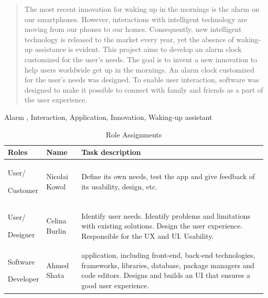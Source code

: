 \documentclass[conference]{IEEEtran}
\begin{document}
\begin{abstract}
The most recent innovation for waking up in the mornings is the alarm on our smartphones. However, interactions with intelligent technology are moving from our phones to our homes. Consequently, new intelligent technology is released to the market every year, yet the absence of waking-up assistance is evident. This project aims to develop an alarm clock customized for the user's needs. The goal is to invent a new innovation to help users worldwide get up in the mornings. An alarm clock customized for the user's needs was designed. To enable user interaction, software was designed to make it possible to connect with family and friends as a part of the user experience.
\end{abstract}

\begin{IEEEkeywords}
Alarm , Interaction, Application, Innovation, Waking-up assistant \end{IEEEkeywords}

\begin{table}[h]
\caption{Role Assignments}
\def\arraystretch{1.24} \small
    \begin{tabular}{|p{1.8cm}|p{1.4cm}|p{4.4cm}|}
        \hline
        Roles & Name & Task description\\ \hline
         User/\par Customer & Nicolai Kowol & Define its own needs, test the app and give feedback of its usability, design, etc.\\ \hline
         
        User/ \par Designer& Celina Burlin  & Identify user needs. Identify problems and limitations with existing solutions. Design the user experience. Responsible for the UX and UI. Usability.\\ \hline
        
        Software\par Developer & Ahmed Shata  & application, including front-end, back-end technologies, frameworks, libraries, database, package managers and code editors. Designs and builds an UI that ensures a good user experience. \\ \hline

	\end{tabular}
\end{table}
\end{document}
